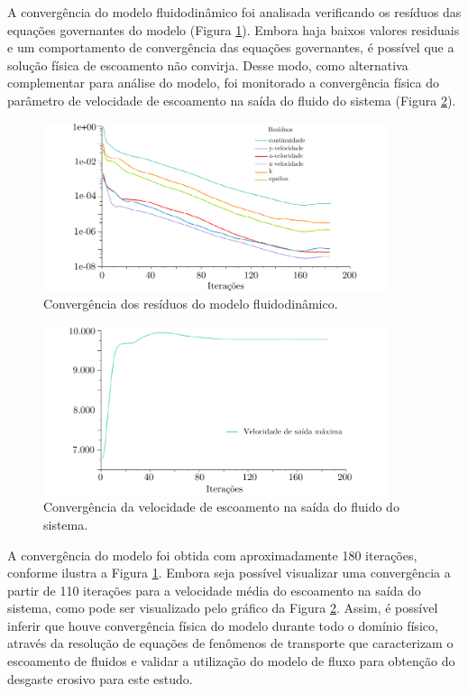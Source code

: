 A convergência do modelo fluidodinâmico foi analisada verificando os resíduos das equações governantes do modelo (Figura \ref{fig:cfdcontinuidade}). Embora haja baixos valores residuais e um comportamento de convergência das equações governantes, é possível que a solução física de escoamento não convirja. Desse modo, como alternativa complementar para análise do modelo, foi monitorado a convergência física do parâmetro de velocidade de escoamento na saída do fluido do sistema (Figura \ref{fig:cfdcontinuidade2}).

\begin{figure}[H] 
    \centering  
    \includegraphics[width=0.90\textwidth]{Figuras/cfddecontinuidade.pdf}  
    \caption{Convergência dos resíduos do modelo fluidodinâmico.}  
    \label{fig:cfdcontinuidade}  
\end{figure}


\begin{figure}[H] 
    \centering  
    \includegraphics[width=0.90\textwidth]{Figuras/cfddecontinuidade2.pdf}  
    \caption{Convergência da velocidade de escoamento na saída do fluido do sistema.}  
    \label{fig:cfdcontinuidade2}  
\end{figure}

A convergência do modelo foi obtida com aproximadamente 180 iterações, conforme ilustra a Figura \ref{fig:cfdcontinuidade}. Embora seja possível visualizar uma
convergência a partir de 110 iterações para a velocidade média do escoamento na saída do sistema, como pode ser visualizado pelo gráfico da Figura \ref{fig:cfdcontinuidade2}. Assim, é possível inferir que houve convergência física do modelo durante todo o domínio físico, através da resolução de equações de fenômenos de transporte que caracterizam o escoamento de fluidos e validar a utilização do modelo de fluxo para obtenção do desgaste erosivo para este estudo. 

